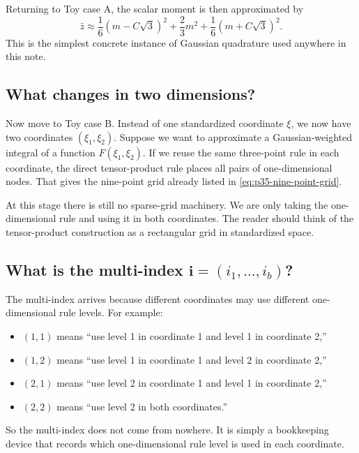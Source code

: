 \documentclass[11pt]{article}
\numberwithin{equation}{section}
\begin{document}
Returning to Toy case A, the scalar moment is then approximated by
\begin{equation}
  \bar z
  \approx
  \frac16(m-C\sqrt3)^2 + \frac23 m^2 + \frac16(m+C\sqrt3)^2.
  \label{eq:p36-scalar-three-point-approx}
\end{equation}
This is the simplest concrete instance of Gaussian quadrature used anywhere in
this note.

\subsection{What changes in two dimensions?}

Now move to Toy case B.  Instead of one standardized coordinate \(\xi\), we now
have two coordinates \((\xi_1,\xi_2)\).  Suppose we want to approximate a
Gaussian-weighted integral of a function \(F(\xi_1,\xi_2)\).  If we reuse the same
three-point rule in each coordinate, the direct tensor-product rule places all
pairs of one-dimensional nodes.  That gives the nine-point grid already listed in
\eqref{eq:p35-nine-point-grid}.

At this stage there is still no sparse-grid machinery.  We are only taking the
one-dimensional rule and using it in both coordinates.  The reader should think
of the tensor-product construction as a rectangular grid in standardized space.

\subsection{What is the multi-index \texorpdfstring{\(\mathbf i=(i_1,\ldots,i_b)\)}{i=(i1,...,ib)}?}

The multi-index arrives because different coordinates may use different
one-dimensional rule levels.  For example:
\begin{itemize}[leftmargin=0.28in]
  \item \((1,1)\) means ``use level 1 in coordinate 1 and level 1 in coordinate
  2,''
  \item \((1,2)\) means ``use level 1 in coordinate 1 and level 2 in coordinate
  2,''
  \item \((2,1)\) means ``use level 2 in coordinate 1 and level 1 in coordinate
  2,''
  \item \((2,2)\) means ``use level 2 in both coordinates.''
\end{itemize}
So the multi-index does not come from nowhere.  It is simply a bookkeeping device
that records which one-dimensional rule level is used in each coordinate.
\end{document}
